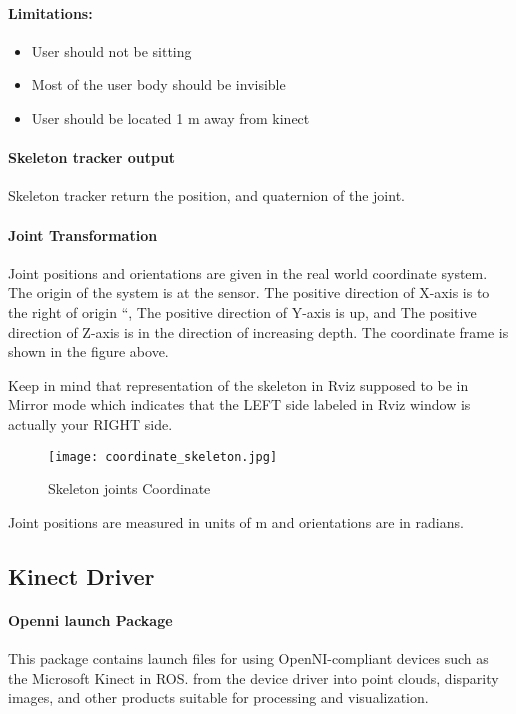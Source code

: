       \paragraph {Limitations:}
\begin{itemize}
	\item User should not be sitting
	\item Most of the user body should be invisible
	\item User should be located 1 m away from kinect
\end{itemize}
\paragraph{Skeleton tracker output}
Skeleton tracker return the position, and quaternion of the joint.

\paragraph{Joint Transformation}
Joint positions and orientations are given in the real world coordinate system. The origin of the system is at the sensor. The positive direction of X-axis is to the right of origin “, The positive direction of Y-axis is up, and The positive direction of Z-axis is in the direction of increasing depth. The coordinate frame is shown in the figure above.


Keep in mind that representation of the skeleton in Rviz supposed to be in Mirror mode which indicates that the LEFT side labeled in Rviz window is actually your RIGHT side.
\begin{figure}[ht]
	\centering
	\texttt{[image: coordinate\_skeleton.jpg]}
    	\caption{Skeleton joints Coordinate}
\end{figure}
Joint positions are measured in units of m and orientations are  in radians.

\subsection{Kinect Driver}
\paragraph{Openni launch Package} This package contains launch files for using OpenNI-compliant devices such as the Microsoft Kinect in ROS.  from the device driver into point clouds, disparity images, and other products suitable for processing and visualization.

